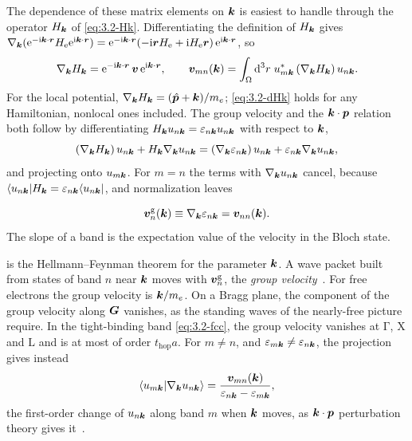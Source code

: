 The dependence of these matrix elements on $\bm{k}$ is easiest to handle through the operator $H_{\bm{k}}$ of \cref{eq:3.2-Hk}. Differentiating the definition of $H_{\bm{k}}$ gives $\nabla_{\bm{k}}(\mathrm{e}^{-\mathrm{i}\bm{k}\cdot\bm{r}}H_{\mathrm{e}}\mathrm{e}^{\mathrm{i}\bm{k}\cdot\bm{r}}) = \mathrm{e}^{-\mathrm{i}\bm{k}\cdot\bm{r}}(-\mathrm{i}\bm{r}H_{\mathrm{e}} + \mathrm{i} H_{\mathrm{e}}\bm{r})\,\mathrm{e}^{\mathrm{i}\bm{k}\cdot\bm{r}}$, so
\begin{equation}
  \nabla_{\bm{k}}H_{\bm{k}} = \mathrm{e}^{-\mathrm{i}\bm{k}\cdot\bm{r}}\,\bm{v}\,\mathrm{e}^{\mathrm{i}\bm{k}\cdot\bm{r}}, \qquad
  \bm{v}_{mn}(\bm{k}) = \int_\Omega\mathrm{d}^3r\;u^*_{m\bm{k}}\,(\nabla_{\bm{k}}H_{\bm{k}})\,u_{n\bm{k}} .
  \label{eq:3.2-dHk}
\end{equation}
For the local potential, $\nabla_{\bm{k}}H_{\bm{k}} = (\hat{\bm{p}} + \bm{k})/m_e$; \cref{eq:3.2-dHk} holds for any Hamiltonian, nonlocal ones included. The group velocity and the $\bm{k}\cdot\bm{p}$ relation both follow by differentiating $H_{\bm{k}}u_{n\bm{k}} = \varepsilon_{n\bm{k}}u_{n\bm{k}}$ with respect to $\bm{k}$,
\begin{equation*}
  (\nabla_{\bm{k}}H_{\bm{k}})\,u_{n\bm{k}} + H_{\bm{k}}\nabla_{\bm{k}}u_{n\bm{k}} = (\nabla_{\bm{k}}\varepsilon_{n\bm{k}})\,u_{n\bm{k}} + \varepsilon_{n\bm{k}}\nabla_{\bm{k}}u_{n\bm{k}},
\end{equation*}
and projecting onto $u_{m\bm{k}}$. For $m = n$ the terms with $\nabla_{\bm{k}}u_{n\bm{k}}$ cancel, because $\langle u_{n\bm{k}}|H_{\bm{k}} = \varepsilon_{n\bm{k}}\langle u_{n\bm{k}}|$, and normalization leaves
\begin{keyresult}
\begin{equation}
  \bm{v}^{\mathrm{g}}_n(\bm{k}) \equiv \nabla_{\bm{k}}\varepsilon_{n\bm{k}} = \bm{v}_{nn}(\bm{k}) .
  \label{eq:3.2-vg}
\end{equation}
The slope of a band is the expectation value of the velocity in the Bloch state.
\end{keyresult}
 is the Hellmann--Feynman theorem for the parameter $\bm{k}$. A wave packet built from states of band $n$ near $\bm{k}$ moves with $\bm{v}^{\mathrm{g}}_n$, the \emph{group velocity}~\cite[Chap.~8 and App.~E]{ashcroft1976solid}. For free electrons the group velocity is $\bm{k}/m_e$. On a Bragg plane, the component of the group velocity along $\bm{G}$ vanishes, as the standing waves of the nearly-free picture require. In the tight-binding band \cref{eq:3.2-fcc}, the group velocity vanishes at $\mathrm{\Gamma}$, $\mathrm{X}$ and $\mathrm{L}$ and is at most of order $t_{\mathrm{hop}}a$. For $m \ne n$, and $\varepsilon_{m\bm{k}} \ne \varepsilon_{n\bm{k}}$, the projection gives instead
\begin{equation}
  \langle u_{m\bm{k}}|\nabla_{\bm{k}}u_{n\bm{k}}\rangle = \frac{\bm{v}_{mn}(\bm{k})}{\varepsilon_{n\bm{k}} - \varepsilon_{m\bm{k}}} ,
  \label{eq:3.2-dudk}
\end{equation}
the first-order change of $u_{n\bm{k}}$ along band $m$ when $\bm{k}$ moves, as $\bm{k}\cdot\bm{p}$ perturbation theory gives it~\cite[Chap.~2]{yu2010fundamentals}.

